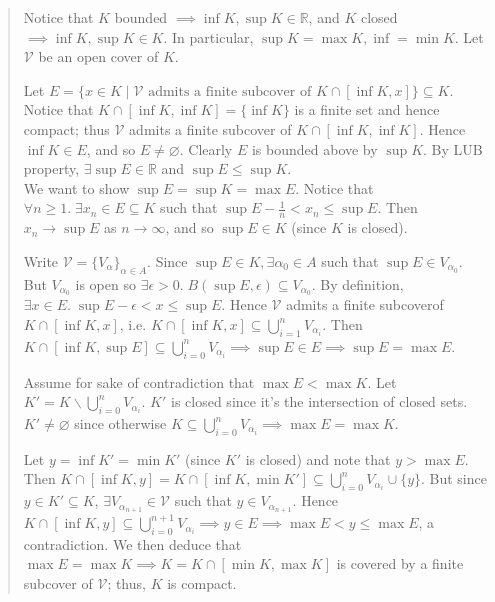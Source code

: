 \documentclass[11pt]{article}
\begin{document}
\begin{quote}\vspace{-0.3cm}
Notice that $K$ bounded $\implies \inf K, \sup K \in \mathbb{R}$, and $K$ closed $\implies \inf K, \sup K \in K$. In particular, $\sup K = \max K, \inf = \min K$. Let $\mathcal{V}$ be an open cover of $K$.

Let $E = \{x \in K \mid \mathcal{V} \text{ admits a finite subcover of }K \cap [\inf K, x]\} \subseteq K$. Notice that $K \cap [\inf K, \inf K] = \{\inf K\}$ is a finite set and hence compact; thus $\mathcal{V}$ admits a finite subcover of $K \cap [\inf K, \inf K]$. Hence $\inf K \in E$, and so $E \neq \varnothing$. Clearly $E$ is bounded above by $\sup K$. By LUB property, $\exists \sup E \in \mathbb{R}$ and $\sup E \leq \sup K$.\\

We want to show $\sup E = \sup K = \max E$. Notice that $\forall n \geq 1.\; \exists x_n \in E \subseteq K$ such that $\sup E - \frac{1}{n} < x_n \leq \sup E$. Then $x_n \to \sup E$ as $n \to \infty$, and so $\sup E \in K$ (since $K$ is closed).

Write $\mathcal{V} = \{V_\alpha\}_{\alpha \in A}$. Since $\sup E \in K, \exists \alpha_0 \in A$ such that $\sup E \in V_{\alpha_0}$. But $V_{\alpha_0}$ is open so $\exists \epsilon > 0.\; B(\sup E, \epsilon) \subseteq V_{\alpha_0}$. By definition, $\exists x \in E.\; \sup E - \epsilon < x \leq \sup E$. Hence $\mathcal{V}$ admits a finite subcoverof $K \cap [\inf K, x]$, i.e. $K \cap [\inf K, x] \subseteq \bigcup_{i=1}^n V_{\alpha_i}$. Then $K \cap [\inf K, \sup E] \subseteq \bigcup_{i=0}^n V_{\alpha_i} \implies \sup E \in E \implies \sup E = \max E$.

Assume for sake of contradiction that $\max E < \max K$. Let $K' = K \backslash \bigcup_{i=0}^n V_{\alpha_i}$. $K'$ is closed since it's the intersection of closed sets. $K'\neq \varnothing$ since otherwise $K \subseteq \bigcup_{i=0}^n V_{\alpha_i} \implies \max E = \max K$.

Let $y = \inf K' = \min K'$ (since $K'$ is closed) and note that $y > \max E$. Then $K \cap [\inf K, y] = K \cap [\inf K, \min K'] \subseteq \bigcup_{i=0}^n V_{\alpha_i} \cup \{y\}$. But since $y \in K' \subseteq K$, $\exists V_{\alpha_{n+1}} \in \mathcal{V}$ such that $y \in V_{\alpha_{n+1}}$. Hence $K \cap [\inf K, y] \subseteq \bigcup_{i=0}^{n+1} V_{\alpha_i} \implies y \in E \implies \max E < y \leq \max E$, a contradiction. We then deduce that $\max E = \max K \implies K = K \cap [\min K, \max K]$ is covered by a finite subcover of $\mathcal{V}$; thus, $K$ is compact.
\end{quote}
\end{document}
